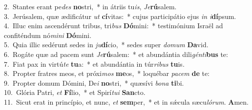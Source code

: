 {2.~}Stantes erant pe\textit{des} \textbf{no}stri,~* in átriis tu\textit{is}, \textit{Je}\textbf{rú}salem.\\
{3.~}Jerúsalem, quæ ædificátur \textit{ut} \textbf{cí}vitas:~* cujus participátio ejus \textit{in} \textit{i}\textbf{dí}psum.\\
{4.~}Illuc enim ascendérunt tribus, tri\textit{bus} \textbf{Dó}mini:~* testimónium Israël ad confiténdum nó\textit{mi}\textit{ni} \textbf{Dó}mini.\\
{5.~}Quia illic sedérunt sedes in \textit{ju}\textbf{dí}cio,~* sedes super \textit{do}\textit{mum} \textbf{Da}vid.\\
{6.~}Rogáte quæ ad pacem sunt \textit{Je}\textbf{rú}salem:~* et abundántia dili\textit{gén}\textit{ti}\textbf{bus} te:\\
{7.~}Fiat pax in virtú\textit{te} \textbf{tu}a:~* et abundántia in túr\textit{ri}\textit{bus} \textbf{tu}is.\\
{8.~}Propter fratres meos, et próxi\textit{mos} \textbf{me}os,~* loquébar \textit{pa}\textit{cem} \textbf{de} te:\\
{9.~}Propter domum Dómini, De\textit{i} \textbf{no}stri,~* quæsívi \textit{bo}\textit{na} \textbf{ti}bi.\\
{10.~}Glória Patri, \textit{et} \textbf{Fí}lio,~* et Spirí\textit{tu}\textit{i} \textbf{San}cto.\\
{11.~}Sicut erat in princípio, et nunc, \textit{et} \textbf{sem}per,~* et in sǽcula sæcu\textit{ló}\textit{rum}. \textbf{A}men.\\
